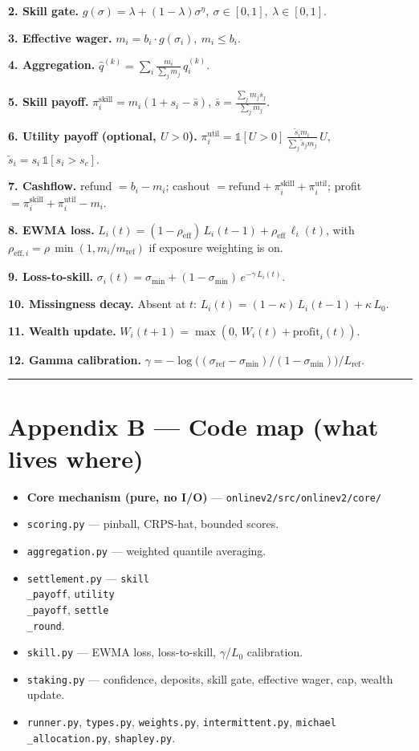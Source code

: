 \documentclass[11pt]{article}
\begin{document}
\textbf{2. Skill gate.} $g(\sigma) = \lambda + (1-\lambda)\sigma^{\eta},\ \sigma \in [0,1],\ \lambda \in [0,1]$.

\textbf{3. Effective wager.} $m_i = b_i \cdot g(\sigma_i),\ m_i \le b_i$.

\textbf{4. Aggregation.} $\hat q^{(k)} = \sum_i \frac{m_i}{\sum_j m_j}\, q_i^{(k)}$.

\textbf{5. Skill payoff.} $\pi_i^{\text{skill}} = m_i(1 + s_i - \bar s)$, $\bar s = \frac{\sum_j m_j s_j}{\sum_j m_j}$.

\textbf{6. Utility payoff (optional, $U>0$).}
$\pi_i^{\text{util}} = \mathbb 1[U>0]\,\frac{\tilde s_i m_i}{\sum_j \tilde s_j m_j}\,U$, $\tilde s_i = s_i\,\mathbb 1[s_i > s_c]$.

\textbf{7. Cashflow.} refund $= b_i - m_i$; cashout $= \text{refund} + \pi_i^{\text{skill}} + \pi_i^{\text{util}}$; profit $= \pi_i^{\text{skill}} + \pi_i^{\text{util}} - m_i$.

\textbf{8. EWMA loss.} $L_i(t) = (1 - \rho_{\text{eff}})\,L_i(t-1) + \rho_{\text{eff}}\,\ell_i(t)$, with $\rho_{\text{eff},i} = \rho\,\min(1, m_i/m_{\text{ref}})$ if exposure weighting is on.

\textbf{9. Loss-to-skill.} $\sigma_i(t) = \sigma_{\min} + (1 - \sigma_{\min})\,e^{-\gamma\, L_i(t)}$.

\textbf{10. Missingness decay.} Absent at $t$: $L_i(t) = (1 - \kappa)\,L_i(t-1) + \kappa\, L_0$.

\textbf{11. Wealth update.} $W_i(t+1) = \max(0,\, W_i(t) + \text{profit}_i(t))$.

\textbf{12. Gamma calibration.} $\gamma = -\log\!\bigl((\sigma_{\text{ref}} - \sigma_{\min})/(1 - \sigma_{\min})\bigr)/L_{\text{ref}}$.

\bigskip\hrule\bigskip

\section{Appendix B --- Code map (what lives where)}


\begin{itemize}
\item \textbf{Core mechanism (pure, no I/O)} --- \texttt{onlinev2/src/onlinev2/core/}
\item \texttt{scoring.py} --- pinball, CRPS-hat, bounded scores.
\item \texttt{aggregation.py} --- weighted quantile averaging.
\item \texttt{settlement.py} --- \texttt{skill\\_payoff}, \texttt{utility\\_payoff}, \texttt{settle\\_round}.
\item \texttt{skill.py} --- EWMA loss, loss-to-skill, $\gamma$/$L_0$ calibration.
\item \texttt{staking.py} --- confidence, deposits, skill gate, effective wager, cap, wealth update.
\item \texttt{runner.py}, \texttt{types.py}, \texttt{weights.py}, \texttt{intermittent.py}, \texttt{michael\\_allocation.py}, \texttt{shapley.py}.
\end{itemize}
\end{document}
